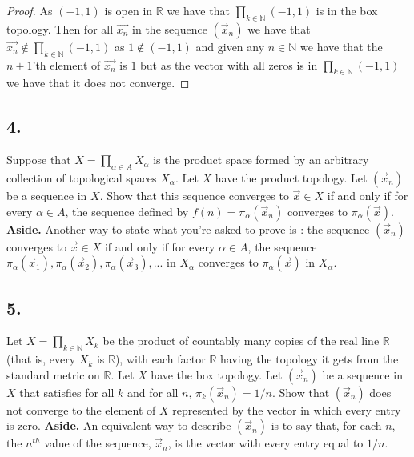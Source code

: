 \documentclass{amsart}
\theoremstyle{plain}
\theoremstyle{definition}
\theoremstyle{remark}
\begin{document}
\begin{proof}

    As $(-1,1)$ is open in $\mathbb{R}$ we have that $\prod_{k\in \mathbb{N}}(-1,1)$ is in the box topology. Then for all $\vec{x_n}$ in the sequence $(\vec x_n)$ we have that $\vec{x_n}\not \in \prod_{k\in \mathbb{N}}(-1,1)$ as $1\not \in (-1,1)$ and given any $n\in \mathbb{N}$ we have that the $n+1$'th element of $\vec{x_n}$ is $1$ but as the vector with all zeros is in $\prod_{k\in \mathbb{N}}(-1,1)$ we have that it does not converge.

    
\end{proof}



\vspace{.15in}

\noindent
\subsection*{4.} Suppose that  $X = \prod _{\alpha \in A} X_{\alpha}$ is the product space formed by an arbitrary collection of topological spaces $X_{\alpha}$. Let $X$ have the product topology. Let $(\vec{x}_n)$ be a sequence in $X$. Show that this sequence converges to $\vec{x} \in X$ if and only if for every $\alpha \in A$, the sequence defined by $f(n) = \pi _{\alpha} (\vec{x}_n)$ converges to $ \pi _{\alpha} (\vec{x})$. {\bfseries Aside.} Another way to state what you're asked to prove is : the sequence $(\vec{x}_n)$ converges to $\vec{x} \in X$ if and only if for every $\alpha \in A$, the sequence $\pi _{\alpha} (\vec{x}_1) , \pi _{\alpha} (\vec{x}_2), \pi _{\alpha} (\vec{x}_3) , . . . $ in $X_{\alpha}$ converges to $ \pi _{\alpha} (\vec{x})$ in $X_{\alpha}$.


\vspace{.15in}

\noindent
\subsection*{5.} Let $X =\prod _{k\in \mathbb N} X_k$ be the product of countably many copies of the real line $\mathbb R$  (that is, every $X_k$ is $\mathbb R$), with each factor $\mathbb R$ having the topology it gets from the standard metric on $\mathbb R$. Let $X$ have the box topology. Let $(\vec{x}_n)$ be a sequence in $X$ that satisfies for all $k$ and for all $n$, $\pi_k  (\vec{x}_n) = 1/n$. Show that $(\vec{x}_n)$ does not converge to the element of $X$ represented by the vector in which every entry is zero. {\bfseries Aside.} An equivalent way to describe $(\vec{x}_n)$ is to say that, for each $n$, the $n^{th}$ value of the sequence, $\vec{x}_n$, is the vector with every entry equal to $1/n$.
\end{document}
